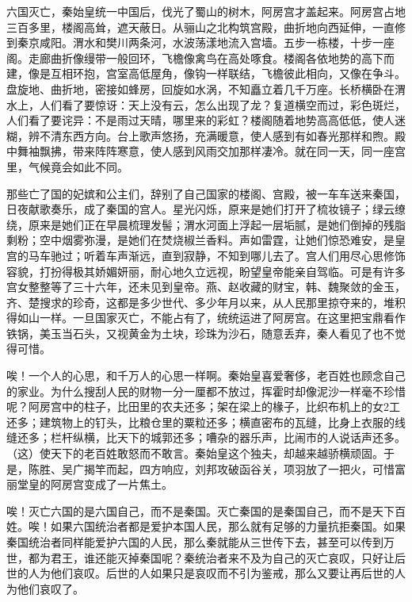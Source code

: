 \documentclass[12pt,UTF-8,openany,a4]{ctexbook}
\begin{document}
\begin{large}\yiwen
    
    六国灭亡，秦始皇统一中国后，伐光了蜀山的树木，阿房宫才盖起来。阿房宫占地三百多里，楼阁高耸，遮天蔽日。从骊山之北构筑宫殿，曲折地向西延伸，一直修到秦京咸阳。渭水和樊川两条河，水波荡漾地流入宫墙。五步一栋楼，十步一座阁。走廊曲折像缦带一般回环，飞檐像禽鸟在高处啄食。楼阁各依地势的高下而建，像是互相环抱，宫室高低屋角，像钩一样联结，飞檐彼此相向，又像在争斗。盘旋地、曲折地，密接如蜂房，回旋如水涡，不知矗立着几千万座。长桥横卧在渭水上，人们看了要惊讶：天上没有云，怎么出现了龙？复道横空而过，彩色斑烂，人们看了要诧异：不是雨过天晴，哪里来的彩虹？楼阁随着地势高高低低，使人迷糊，辨不清东西方向。台上歌声悠扬，充满暖意，使人感到有如春光那样和煦。殿中舞袖飘拂，带来阵阵寒意，使人感到风雨交加那样凄冷。就在同一天，同一座宫里，气候竟会如此不同。
    
    那些亡了国的妃嫔和公主们，辞别了自己国家的楼阁、宫殿，被一车车送来秦国，日夜献歌奏乐，成了秦国的宫人。星光闪烁，原来是她们打开了梳妆镜子；绿云缭绕，原来是她们正在早晨梳理发髻；渭水河面上浮起一层垢腻，是她们倒掉的残脂剩粉；空中烟雾弥漫，是她们在焚烧椒兰香料。声如雷霆，让她们惊恐难安，是皇宫的马车驰过；听着车声渐远，直到寂静，不知到哪儿去了。宫人们用尽心思修饰容貌，打扮得极其娇媚妍丽，耐心地久立远视，盼望皇帝能亲自驾临。可是有许多宫女整整等了三十六年，还未见到皇帝。燕、赵收藏的财宝，韩、魏聚敛的金玉，齐、楚搜求的珍奇，这都是多少世代、多少年月以来，从人民那里掠夺来的，堆积得如山一样。一旦国家灭亡，不能占有了，统统运进了阿房宫。在这里把宝鼎看作铁锅，美玉当石头，又视黄金为土块，珍珠为沙石，随意丢弃，秦人看见了也不觉得可惜。
    
    唉！一个人的心思，和千万人的心思一样啊。秦始皇喜爱奢侈，老百姓也顾念自己的家业。为什么搜刮人民的财物一分一厘都不放过，挥霍时却像泥沙一样毫不珍惜呢？阿房宫中的柱子，比田里的农夫还多；架在梁上的椽子，比织布机上的女2工还多；建筑物上的钉头，比粮仓里的粟粒还多；横直密布的瓦缝，比身上衣服的线缝还多；栏杆纵横，比天下的城郭还多；嘈杂的器乐声，比闹市的人说话声还多。（这）使天下的老百姓敢怒而不敢言。秦始皇这个独夫，却越来越骄横顽固。于是，陈胜、吴广揭竿而起，四方响应，刘邦攻破函谷关，项羽放了一把火，可惜富丽堂皇的阿房宫变成了一片焦土。
    
    唉！灭亡六国的是六国自己，而不是秦国。灭亡秦国的是秦国自己，而不是天下百姓。唉！如果六国统治者都是爱护本国人民，那么就有足够的力量抗拒秦国。如果秦国统治者同样能爱护六国的人民，那么秦就能从三世传下去，甚至可以传到万世，都为君王，谁还能灭掉秦国呢？秦统治者来不及为自己的灭亡哀叹，只好让后世的人为他们哀叹。后世的人如果只是哀叹而不引为鉴戒，那么又要让再后世的人为他们哀叹了。
    

\end{large}
\end{document}
